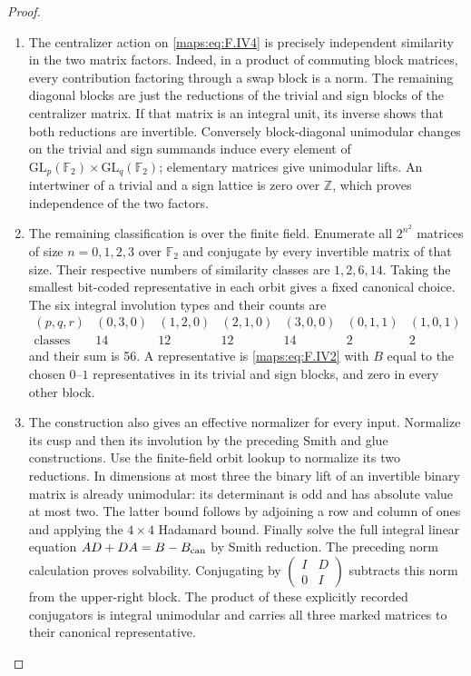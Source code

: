 \documentclass[11pt,a4paper]{article}
\numberwithin{equation}{section}
\theoremstyle{definition}
\begin{document}
\begin{proof}
\begin{enumerate}[label=\arabic*.]
\item The centralizer action on \eqref{maps:eq:F.IV4} is precisely independent
similarity in the two matrix factors.  Indeed, in a product
of commuting block matrices, every contribution factoring
through a swap block is a norm.  The remaining diagonal
blocks are just the reductions of the trivial and sign
blocks of the centralizer matrix.  If that matrix is an
integral unit, its inverse shows that both reductions are
invertible.  Conversely block-diagonal unimodular changes
on the trivial and sign summands induce every element of
$\mathrm{GL}_p(\mathbb F_2)\times
\mathrm{GL}_q(\mathbb F_2)$; elementary matrices give
unimodular lifts.  An intertwiner of a trivial and a sign lattice is zero over $\mathbb Z$, which proves independence of the two factors.

\item The remaining classification is over the finite field.  Enumerate
all $2^{n^2}$ matrices of size $n=0,1,2,3$ over $\mathbb F_2$
and conjugate by every invertible matrix of that size.
Their respective numbers of similarity classes are
$1,2,6,14$.  Taking the smallest bit-coded representative
in each orbit gives a fixed canonical choice.
The six integral involution types and their counts are
\[
\begin{array}{c|rrrrrr}
 (p,q,r)&(0,3,0)&(1,2,0)&(2,1,0)&(3,0,0)&(0,1,1)&(1,0,1)\\\hline
 \text{classes}&14&12&12&14&2&2
\end{array}
\]
and their sum is 56.  A representative is \eqref{maps:eq:F.IV2} with
$B$ equal to the chosen $0$--$1$ representatives in its
trivial and sign blocks, and zero in every other block.

\item The construction also gives an effective normalizer for every input.  Normalize its
cusp and then its involution by the preceding Smith and
glue constructions.  Use the finite-field orbit lookup to
normalize its two reductions.  In dimensions at most three
the binary lift of an invertible binary matrix is already
unimodular: its determinant is odd and has absolute value
at most two.  The latter bound follows by adjoining a row
and column of ones and applying the $4\times4$ Hadamard
bound.  Finally solve the full integral linear equation
$AD+DA=B-B_{\rm can}$ by Smith reduction.  The preceding
norm calculation proves solvability.  Conjugating by
$\begin{pmatrix}I&D\\0&I\end{pmatrix}$ subtracts this norm
from the upper-right block.  The product of these explicitly
recorded conjugators is integral unimodular and carries all
three marked matrices to their canonical representative.


\end{enumerate}
\end{proof}
\end{document}
